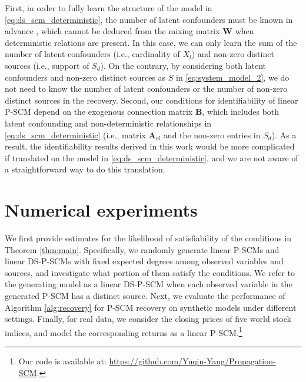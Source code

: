 \documentclass[12pt]{article}
\newcommand{\bA}{\mathbf{A}}
\newcommand{\bB}{\mathbf{B}}
\newcommand{\bW}{\mathbf{W}}
\begin{document}
First, in order to fully learn the structure of the model in \eqref{eq:ds_scm_deterministic}, the number of latent confounders must be known in advance \citep{hoyer2008estimation,salehkaleybar2020learning}, which cannot be deduced from the mixing matrix $\bW$ when deterministic relations are present. In this case, we can only learn the sum of the number of latent confounders (i.e., cardinality of $X_l$) and non-zero distinct sources (i.e., support of $S_d$). On the contrary, by considering both latent confounders and non-zero distinct sources as $S$ in \eqref{eq:system_model_2}, we do not need to know the number of latent confounders or the number of non-zero distinct sources in the recovery. Second, our conditions for identifiability of linear P-SCM depend on the exogenous connection matrix $\bB$, which includes both latent confounding and non-deterministic relationships in \eqref{eq:ds_scm_deterministic} (i.e., matrix $\bA_{ol}$ and the non-zero entries in $S_d$). As a result, the identifiability results derived in this work would be more complicated if translated on the model in \eqref{eq:ds_scm_deterministic}, and we are not aware of a straightforward way to do this translation. %

\vspace{-4mm}
\section{Numerical experiments} \label{sec:simulations}
\vspace{-2mm}
We first provide estimates for the likelihood of satisfiability of the conditions in Theorem \ref{thm:main}. Specifically, we randomly generate linear P-SCMs and linear DS-P-SCMs with fixed expected degrees among observed variables and sources, and investigate what portion of them satisfy the conditions. We refer to the generating model as a linear DS-P-SCM when each observed variable in the generated P-SCM has a distinct source. Next, we evaluate the performance of Algorithm \ref{alg:recovery} for P-SCM recovery on synthetic models under different settings. Finally, for real data, we consider the closing prices of five world stock indices, and model the corresponding returns as a linear P-SCM.\footnote{Our code is available at:
\url{https://github.com/Yuqin-Yang/Propagation-SCM}.}
\end{document}
